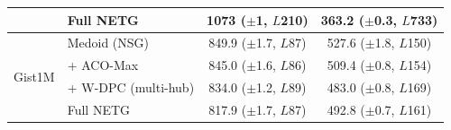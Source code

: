 \begin{table}[t]
{\begin{tabular}{llcc}
 & Full NETG & 1073 ({\scriptsize $\pm$1, $L$210}) & 363.2 ({\scriptsize $\pm$0.3, $L$733}) \\
\midrule
\multirow{4}{*}{Gist1M} & Medoid (NSG) & 849.9 ({\scriptsize $\pm$1.7, $L$87}) & 527.6 ({\scriptsize $\pm$1.8, $L$150}) \\
 & + ACO-Max & 845.0 ({\scriptsize $\pm$1.6, $L$86}) & 509.4 ({\scriptsize $\pm$0.8, $L$154}) \\
 & + W-DPC (multi-hub) & 834.0 ({\scriptsize $\pm$1.2, $L$89}) & 483.0 ({\scriptsize $\pm$0.8, $L$169}) \\
 & Full NETG & 817.9 ({\scriptsize $\pm$1.7, $L$87}) & 492.8 ({\scriptsize $\pm$0.7, $L$161}) \\
\midrule
\bottomrule
\end{tabular}}
\end{table}

